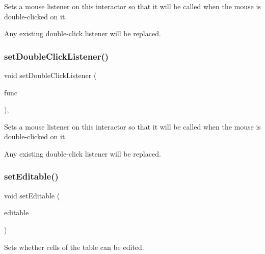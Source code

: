 Sets a mouse listener on this interactor so that it will be called when the mouse is double-\/clicked on it. 

Any existing double-\/click listener will be replaced. \mbox{\label{classsgl_1_1GInteractor_a50096194d66f48c92dd4c512d41bfc76}} 
\subsubsection{\texorpdfstring{set\+Double\+Click\+Listener()}{setDoubleClickListener()}\hspace{0.1cm}{\footnotesize\ttfamily [2/2]}}
{\footnotesize\ttfamily void set\+Double\+Click\+Listener (\begin{DoxyParamCaption}\item[{\mbox{\hyperlink{namespacesgl_a54427ce97bb1c2804e4fe2b0a62e8b17}{G\+Event\+Listener\+Void}}}]{func }\end{DoxyParamCaption})\hspace{0.3cm}{\ttfamily [virtual]}, {\ttfamily [inherited]}}



Sets a mouse listener on this interactor so that it will be called when the mouse is double-\/clicked on it. 

Any existing double-\/click listener will be replaced. \mbox{\label{classsgl_1_1GTable_a52455aaff9ee352ca405fa61ba246b84}} 
\subsubsection{\texorpdfstring{set\+Editable()}{setEditable()}}
{\footnotesize\ttfamily void set\+Editable (\begin{DoxyParamCaption}\item[{bool}]{editable }\end{DoxyParamCaption})\hspace{0.3cm}{\ttfamily [virtual]}}



Sets whether cells of the table can be edited. 

